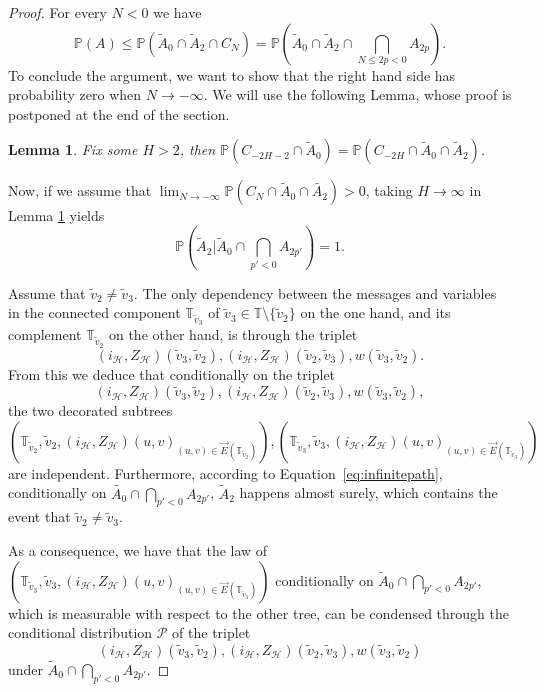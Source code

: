\documentclass[11pt]{article}
\newtheorem{lemma}[prop]{Lemma}
\begin{document}
\begin{proof}
For every $N <0$ we have
\[ \mathbb{P}(A) \leq \mathbb{P}(\tilde A_0\cap \tilde A_2 \cap C_N) = \mathbb{P}\left( \tilde A_0 \cap \tilde A_2 \cap \bigcap_{N\leq 2p < 0} A_{2p} \right)  . \]
To conclude the argument, we want to show that the right hand side has probability zero when $N \rightarrow -\infty$. We will use the following Lemma, whose proof is postponed at the end of the section.
\begin{lemma}\label{lem:doublyinfinitepath}
Fix some $H>2$, then $\mathbb{P}(C_{-2H-2}\cap \tilde{A}_0)=\mathbb{P}(C_{-2H} \cap \tilde{A}_0 \cap \tilde{A}_2)$.
\end{lemma}

Now, if we assume that $ \lim_{N \rightarrow -\infty} \mathbb{P}(C_{N}\cap \tilde{A}_0 \cap \tilde{A_2})>0$, taking $H \rightarrow \infty$ in Lemma \ref{lem:doublyinfinitepath} yields
\begin{equation}\label{eq:infinitepath}
 \mathbb{P}\left(  \tilde{A}_{2}  \bigg| \tilde A_0 \cap \bigcap_{p' < 0} A_{2p'}  \right) =1.
\end{equation}

Assume that $\tilde{v}_2\neq \tilde{v}_3$. The only dependency between the messages and variables in the connected component $\mathbb{T}_{\tilde{v}_{3}}$ of $\tilde{v}_{3} \in \mathbb{T}\setminus \{\tilde{v}_{2} \}$ on the one hand, and its complement $\mathbb T_{\tilde{v}_{2}}$ on the other hand, is through the triplet
\[(i_{\mathcal{H}},Z_{\mathcal{H}})(\tilde{v}_{3},\tilde{v}_{2}),(i_{\mathcal{H}},Z_{\mathcal{H}})(\tilde{v}_{2},\tilde{v}_{3}) ,w(\tilde{v}_{3},\tilde{v}_{2}). \] 
From this we deduce that conditionally on the triplet
\[(i_{\mathcal{H}},Z_{\mathcal{H}})(\tilde{v}_{3},\tilde{v}_{2}),(i_{\mathcal{H}},Z_{\mathcal{H}})(\tilde{v}_{2},\tilde{v}_{3}) ,w(\tilde{v}_{3},\tilde{v}_{2}), \]
 the two decorated subtrees \[\left(\mathbb{T}_{\tilde{v}_{2}},\tilde{v}_{2},(i_{\mathcal{H}},Z_{\mathcal{H}})(u,v)_{(u,v)\in \overset{\rightarrow}{E}(\mathbb{T}_{\tilde{v}_{2}})}\right),\left(\mathbb{T}_{\tilde{v}_{3}},\tilde{v}_{3},(i_{\mathcal{H}},Z_{\mathcal{H}})(u,v)_{(u,v)\in \overset{\rightarrow}{E}(\mathbb{T}_{\tilde{v}_{3}})}\right) \] are independent. Furthermore, according to Equation~\eqref{eq:infinitepath}, conditionally on $\tilde{A_0}\cap \bigcap_{p'<0}A_{2p'}$, $\tilde{A}_{2}$ happens almost surely, which contains the event that $\tilde{v}_2 \neq \tilde{v}_3$.
 
As a consequence, we have that the law of
$\left(\mathbb{T}_{\tilde{v}_{3}},\tilde{v}_{3},(i_{\mathcal{H}},Z_{\mathcal{H}})(u,v)_{(u,v)\in \overset{\rightarrow}{E}(\mathbb{T}_{\tilde{v}_{3}})}\right)$
conditionally on $\tilde A_0 \cap \bigcap_{p' < 0}A_{2p'}$, which is measurable with respect to the other tree, can be condensed through the conditional distribution $\mathcal{P}$ of the triplet  \[(i_{\mathcal{H}},Z_{\mathcal{H}})(\tilde{v}_{3},\tilde{v}_{2}),(i_{\mathcal{H}},Z_{\mathcal{H}})(\tilde{v}_{2},\tilde{v}_{3}) ,w(\tilde{v}_{3},\tilde{v}_{2}) \] under $\tilde A_0 \cap \bigcap_{p' < 0}A_{2p'}$.




\end{proof}
\end{document}
